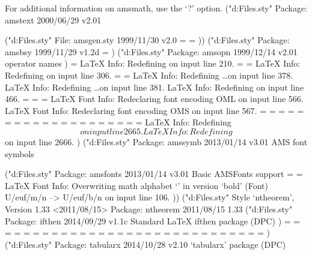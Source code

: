 For additional information on amsmath, use the `?' option.
("d:\Program Files\tex\latex\amsmath\amstext.sty"
Package: amstext 2000/06/29 v2.01

("d:\Program Files\tex\latex\amsmath\amsgen.sty"
File: amsgen.sty 1999/11/30 v2.0
\@emptytoks=
\ex@=
))
("d:\Program Files\tex\latex\amsmath\amsbsy.sty"
Package: amsbsy 1999/11/29 v1.2d
\pmbraise@=
)
("d:\Program Files\tex\latex\amsmath\amsopn.sty"
Package: amsopn 1999/12/14 v2.01 operator names
)
\inf@bad=
LaTeX Info: Redefining \frac on input line 210.
\uproot@=
\leftroot@=
LaTeX Info: Redefining \overline on input line 306.
\classnum@=
\DOTSCASE@=
LaTeX Info: Redefining \ldots on input line 378.
LaTeX Info: Redefining \dots on input line 381.
LaTeX Info: Redefining \cdots on input line 466.
\Mathstrutbox@=
\strutbox@=
\big@size=
LaTeX Font Info:    Redeclaring font encoding OML on input line 566.
LaTeX Font Info:    Redeclaring font encoding OMS on input line 567.
\macc@depth=
\c@MaxMatrixCols=
\dotsspace@=
\c@parentequation=
\dspbrk@lvl=
\tag@help=
\row@=
\column@=
\maxfields@=
\andhelp@=
\eqnshift@=
\alignsep@=
\tagshift@=
\tagwidth@=
\totwidth@=
\lineht@=
\@envbody=
\multlinegap=
\multlinetaggap=
\mathdisplay@stack=
LaTeX Info: Redefining \[ on input line 2665.
LaTeX Info: Redefining \] on input line 2666.
)
("d:\Program Files\tex\latex\amsfonts\amssymb.sty"
Package: amssymb 2013/01/14 v3.01 AMS font symbols

("d:\Program Files\tex\latex\amsfonts\amsfonts.sty"
Package: amsfonts 2013/01/14 v3.01 Basic AMSFonts support
\symAMSa=
\symAMSb=
LaTeX Font Info:    Overwriting math alphabet `\mathfrak' in version `bold'
(Font)                  U/euf/m/n --> U/euf/b/n on input line 106.
))
("d:\Program Files\tex\latex\ntheorem\ntheorem.sty"
Style `ntheorem', Version 1.33 <2011/08/15>
Package: ntheorem 2011/08/15 1.33
("d:\Program Files\tex\latex\base\ifthen.sty"
Package: ifthen 2014/09/29 v1.1c Standard LaTeX ifthen package (DPC)
)
\theorem@style=
\theorem@@style=
\theorembodyfont=
\theoremnumbering=
\theorempreskipamount=
\theorempostskipamount=
\theoremframepreskipamount=
\theoremframepostskipamount=
\theoreminframepreskipamount=
\theoreminframepostskipamount=
\theorem@preskip=
\theorem@postskip=
\theorem@framepreskip=
\theorem@framepostskip=
\theorem@inframepreskip=
\theorem@inframepostskip=
\theoremindent=
\theorem@indent=
\theoremrightindent=
\theorem@rightindent=
\theoremheaderfont=
\theoremseparator=
\theoremprework=
\theorempostwork=
\theoremsymbol=
\qedsymbol=
\theoremkeyword=
\qedsymbol=
\thm@topsep=
\thm@topsepadd=
)
("d:\Program Files\tex\latex\tools\tabularx.sty"
Package: tabularx 2014/10/28 v2.10 `tabularx' package (DPC)

